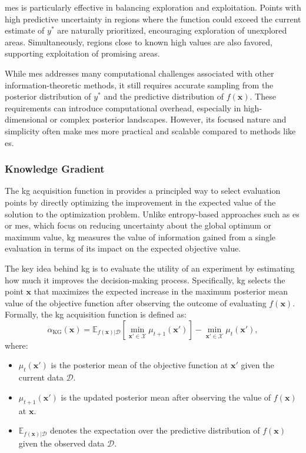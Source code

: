 \ac{mes} is particularly effective in balancing exploration and exploitation. Points with high predictive uncertainty in regions where the function could exceed the current estimate of $y^*$ are naturally prioritized, encouraging exploration of unexplored areas. Simultaneously, regions close to known high values are also favored, supporting exploitation of promising areas.

While \ac{mes} addresses many computational challenges associated with other information-theoretic methods, it still requires accurate sampling from the posterior distribution of $y^*$ and the predictive distribution of $f(\mathbf{x})$. These requirements can introduce computational overhead, especially in high-dimensional or complex posterior landscapes. However, its focused nature and simplicity often make \ac{mes} more practical and scalable compared to methods like \ac{es}.
\subsubsection{Knowledge Gradient}
\label{section:knowledge_gradient}

The \acf{kg} acquisition function in \citet{frazier2008knowledge, wu2016parallel} provides a principled way to select evaluation points by directly optimizing the improvement in the expected value of the solution to the optimization problem. Unlike entropy-based approaches such as \ac{es} or \ac{mes}, which focus on reducing uncertainty about the global optimum or maximum value, \ac{kg} measures the value of information gained from a single evaluation in terms of its impact on the expected objective value.

The key idea behind \ac{kg} is to evaluate the utility of an experiment by estimating how much it improves the decision-making process. Specifically, \ac{kg} selects the point $\mathbf{x}$ that maximizes the expected increase in the maximum posterior mean value of the objective function after observing the outcome of evaluating $f(\mathbf{x})$. Formally, the \ac{kg} acquisition function is defined as:
\begin{equation}
    \alpha_{\text{KG}}(\mathbf{x}) = \mathbb{E}_{f(\mathbf{x}) \vert \mathcal{D}} \left[ \min_{\mathbf{x}' \in \mathcal{X}} \mu_{t+1}(\mathbf{x}') \right] - \min_{\mathbf{x}' \in \mathcal{X}} \mu_t(\mathbf{x}'),
\end{equation}
where:
\begin{itemize}
    \item $\mu_t(\mathbf{x}')$ is the posterior mean of the objective function at $\mathbf{x}'$ given the current data $\mathcal{D}$.
    \item $\mu_{t+1}(\mathbf{x}')$ is the updated posterior mean after observing the value of $f(\mathbf{x})$ at $\mathbf{x}$.
    \item $\mathbb{E}_{f(\mathbf{x}) \vert \mathcal{D}}$ denotes the expectation over the predictive distribution of $f(\mathbf{x})$ given the observed data $\mathcal{D}$.
\end{itemize}

